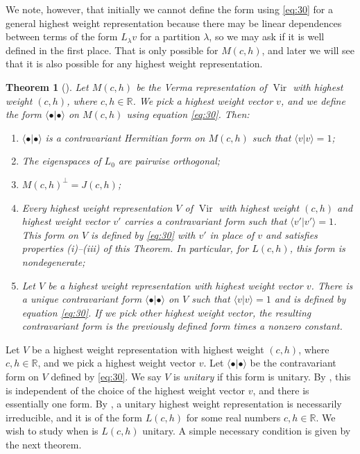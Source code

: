 \documentclass[a4paper, 12pt, reqno]{amsart}
\newtheorem{theorem}{Theorem}[section]
\theoremstyle{remark}
\numberwithin{equation}{subsection}
\DeclareMathOperator{\Vir}{Vir}
\begin{document}
We note, however, that initially we cannot define the form using \eqref{eq:30} for a general highest weight representation because there may be linear dependences between terms of the form $L_{\lambda}v$ for a partition $\lambda$, so we may ask if it is well defined in the first place.
That is only possible for $M(c, h)$, and later we will see that it is also possible for any highest weight representation.

\begin{theorem}[{\cite[Proposition 3.4]{kac_bombay_2013}}]
  \label{thr:29}
  Let $M(c, h)$ be the Verma representation of $\Vir$ with highest weight $(c, h)$, where $c, h \in \mathbb{R}$.
  We pick a highest weight vector $v$, and we define the form $\langle\bullet| \bullet\rangle$ on $M(c, h)$ using equation \eqref{eq:30}.
  Then:
  \begin{enumerate}
  \item $\langle\bullet| \bullet\rangle$ is a contravariant Hermitian form on $M(c, h)$ such that $\langle v| v\rangle = 1$;
  \item The eigenspaces of $L_0$ are pairwise orthogonal;
  \item $M(c, h)^{\perp} = J(c, h)$;
  \item Every highest weight representation $V$ of $\Vir$ with highest weight $(c, h)$ and highest weight vector $v'$ carries a contravariant form such that $\langle v'| v'\rangle = 1$.
    This form on $V$ is defined by \eqref{eq:30} with $v'$ in place of $v$ and satisfies properties \emph{(i)--(iii)} of this Theorem.
    In particular, for $L(c, h)$, this form is nondegenerate;
  \item Let $V$ be a highest weight representation with highest weight vector $v$.
    There is a unique contravariant form $\langle\bullet| \bullet\rangle$ on $V$ such that $\langle v| v\rangle = 1$ and is defined by equation \eqref{eq:30}.
    If we pick other highest weight vector, the resulting contravariant form is the previously defined form times a nonzero constant.
  \end{enumerate}
\end{theorem}

Let $V$ be a highest weight representation with highest weight $(c, h)$, where $c, h \in \mathbb{R}$, and we pick a highest weight vector $v$.
Let $\langle\bullet| \bullet\rangle$ be the contravariant form on $V$ defined by \eqref{eq:30}.
We say $V$ is \emph{unitary} if this form is unitary.
By , this is independent of the choice of the highest weight vector $v$, and there is essentially one form.
By , a unitary highest weight representation is necessarily irreducible, and it is of the form $L(c, h)$ for some real numbers $c, h \in \mathbb{R}$.
We wish to study when is $L(c, h)$ unitary.
A simple necessary condition is given by the next theorem.
\end{document}
